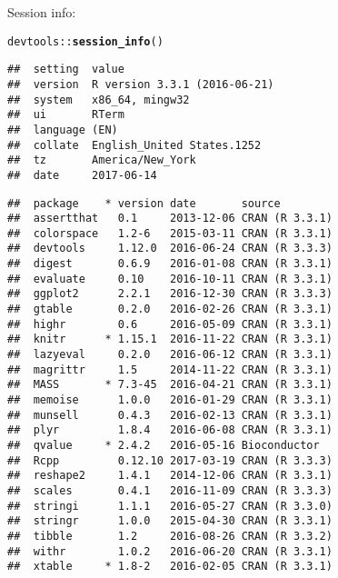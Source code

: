 \documentclass{article}\usepackage[]{graphicx}\usepackage[]{color}
\makeatletter
\newcommand{\hlopt}[1]{\textcolor[rgb]{0,0,0}{#1}}%
\newcommand{\hlstd}[1]{\textcolor[rgb]{0.345,0.345,0.345}{#1}}%
\newcommand{\hlkwd}[1]{\textcolor[rgb]{0.737,0.353,0.396}{\textbf{#1}}}%
\newenvironment{kframe}{%
 \def\at@end@of@kframe{}%
 \ifinner\ifhmode%
  \def\at@end@of@kframe{\end{minipage}}%
  \begin{minipage}{\columnwidth}%
 \fi\fi%
 \def\FrameCommand##1{\hskip\@totalleftmargin \hskip-\fboxsep
 \colorbox{shadecolor}{##1}\hskip-\fboxsep
     \hskip-\linewidth \hskip-\@totalleftmargin \hskip\columnwidth}%
 \MakeFramed {\advance\hsize-\width
   \@totalleftmargin\z@ \linewidth\hsize
   \@setminipage}}%
 {\par\unskip\endMakeFramed%
 \at@end@of@kframe}
\newenvironment{knitrout}{}{} %
\makeatother
\begin{document}
Session info:
\begin{knitrout}
\color{fgcolor}\begin{kframe}
\begin{alltt}
\hlstd{devtools}\hlopt{::}\hlkwd{session_info}\hlstd{()}
\end{alltt}


{\ttfamily\noindent\itshape\color{messagecolor}{\#\# Session info -----------------------------------------------}}\begin{verbatim}
##  setting  value                       
##  version  R version 3.3.1 (2016-06-21)
##  system   x86_64, mingw32             
##  ui       RTerm                       
##  language (EN)                        
##  collate  English_United States.1252  
##  tz       America/New_York            
##  date     2017-06-14
\end{verbatim}


{\ttfamily\noindent\itshape\color{messagecolor}{\#\# Packages ---------------------------------------------------}}\begin{verbatim}
##  package    * version date       source        
##  assertthat   0.1     2013-12-06 CRAN (R 3.3.1)
##  colorspace   1.2-6   2015-03-11 CRAN (R 3.3.1)
##  devtools     1.12.0  2016-06-24 CRAN (R 3.3.3)
##  digest       0.6.9   2016-01-08 CRAN (R 3.3.1)
##  evaluate     0.10    2016-10-11 CRAN (R 3.3.1)
##  ggplot2      2.2.1   2016-12-30 CRAN (R 3.3.3)
##  gtable       0.2.0   2016-02-26 CRAN (R 3.3.1)
##  highr        0.6     2016-05-09 CRAN (R 3.3.1)
##  knitr      * 1.15.1  2016-11-22 CRAN (R 3.3.1)
##  lazyeval     0.2.0   2016-06-12 CRAN (R 3.3.1)
##  magrittr     1.5     2014-11-22 CRAN (R 3.3.1)
##  MASS       * 7.3-45  2016-04-21 CRAN (R 3.3.1)
##  memoise      1.0.0   2016-01-29 CRAN (R 3.3.1)
##  munsell      0.4.3   2016-02-13 CRAN (R 3.3.1)
##  plyr         1.8.4   2016-06-08 CRAN (R 3.3.1)
##  qvalue     * 2.4.2   2016-05-16 Bioconductor  
##  Rcpp         0.12.10 2017-03-19 CRAN (R 3.3.3)
##  reshape2     1.4.1   2014-12-06 CRAN (R 3.3.1)
##  scales       0.4.1   2016-11-09 CRAN (R 3.3.3)
##  stringi      1.1.1   2016-05-27 CRAN (R 3.3.0)
##  stringr      1.0.0   2015-04-30 CRAN (R 3.3.1)
##  tibble       1.2     2016-08-26 CRAN (R 3.3.2)
##  withr        1.0.2   2016-06-20 CRAN (R 3.3.1)
##  xtable     * 1.8-2   2016-02-05 CRAN (R 3.3.1)
\end{verbatim}
\end{kframe}
\end{knitrout}
\end{document}
